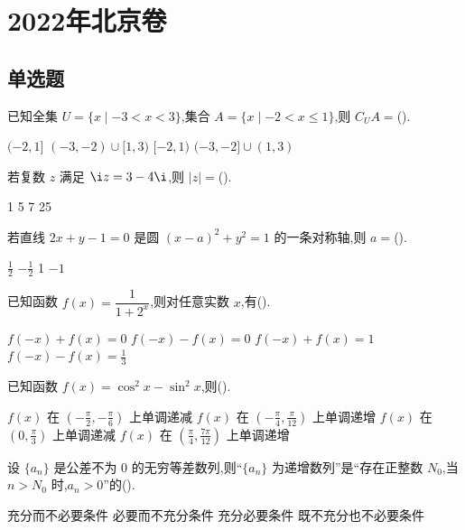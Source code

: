 \chapter{2022年北京卷}

\section{单选题}

\begin{problem}
已知全集 \(U=\{x\mid -3<x<3\}\),集合 \(A=\{x\mid -2<x\le 1\}\),则 \(C_UA=\)(\quad).

\choices
    {\((-2,1]\)}
    {\((-3,-2)\cup[1,3)\)}
    {\([-2,1)\)}
    {\((-3,-2]\cup(1,3)\)}
\end{problem}

\begin{problem}
若复数 \(z\) 满足 \(\i z=3-4\i\),则 \(|z|=\)(\quad).

\choices
    {1}
    {5}
    {7}
    {25}
\end{problem}

\begin{problem}
若直线 \(2x+y-1=0\) 是圆 \((x-a)^2+y^2=1\) 的一条对称轴,则 \(a=\)(\quad).

\choices
    {\(\frac12\)}
    {\(-\frac12\)}
    {1}
    {\(-1\)}
\end{problem}

\begin{problem}
已知函数 \(f(x)=\dfrac{1}{1+2^x}\),则对任意实数 \(x\),有(\quad).

\choices
    {\(f(-x)+f(x)=0\)}
    {\(f(-x)-f(x)=0\)}
    {\(f(-x)+f(x)=1\)}
    {\(f(-x)-f(x)=\frac13\)}
\end{problem}

\begin{problem}
已知函数 \(f(x)=\cos^2x-\sin^2x\),则(\quad).

\choices
    {\(f(x)\) 在 \(\left(-\frac{\pi}{2},-\frac{\pi}{6}\right)\) 上单调递减}
    {\(f(x)\) 在 \(\left(-\frac{\pi}{4},\frac{\pi}{12}\right)\) 上单调递增}
    {\(f(x)\) 在 \(\left(0,\frac{\pi}{3}\right)\) 上单调递减}
    {\(f(x)\) 在 \(\left(\frac{\pi}{4},\frac{7\pi}{12}\right)\) 上单调递增}
\end{problem}

\begin{problem}
设 \(\{a_n\}\) 是公差不为 0 的无穷等差数列,则``\(\{a_n\}\) 为递增数列''是``存在正整数 \(N_0\),当 \(n>N_0\) 时,\(a_n>0\)''的(\quad).

\choices
    {充分而不必要条件}
    {必要而不充分条件}
    {充分必要条件}
    {既不充分也不必要条件}
\end{problem}

